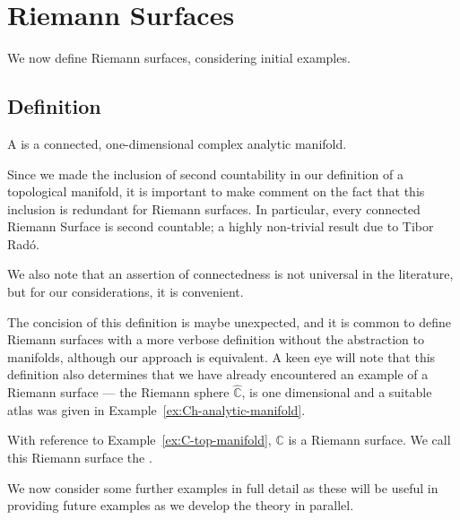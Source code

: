 \chapter{Riemann Surfaces}
\begin{chout}
	We now define Riemann surfaces, considering initial examples.
\end{chout}

\section{Definition}
\begin{definition}
	A  is a connected, one-dimensional complex analytic
	manifold.
\end{definition}

\begin{remark}
	Since we made the inclusion of second countability in our definition of a
	topological manifold, it is important to make comment on the fact that this
	inclusion is redundant for Riemann surfaces. In particular, every connected
	Riemann Surface is second countable; a highly non-trivial result due to Tibor
	Rad\'o\sidenotemark.

	We also note that an assertion of connectedness is not universal in the
	literature, but for our considerations, it is convenient.
\end{remark}

The concision of this definition is maybe unexpected, and it is
common to define Riemann surfaces
with a more verbose definition without the abstraction to manifolds, although
our approach is equivalent. A keen eye will note that this definition also
determines that we have already encountered an example of a Riemann surface ---
the Riemann sphere $ \hat{\mathbb{C}} $, is one dimensional and a suitable atlas
was given in Example~\ref{ex:Ch-analytic-manifold}.

\begin{example}\label{ex:C-open-subset}
	With reference to Example~\ref{ex:C-top-manifold}, $ \mathbb{C} $ is a Riemann
	surface. We call this Riemann surface the .
\end{example}

We now consider some further examples in full detail as these will be useful in
providing future examples as we develop the theory in parallel.


